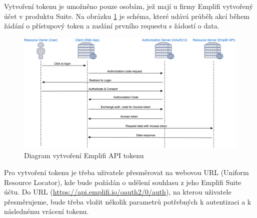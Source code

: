 \documentclass[czech, bc, kiv, he, iso690numb]{fasthesis}
\begin{document}
Vytvoření tokenu je umožněno pouze osobám, jež mají u firmy Emplifi vytvořený účet v produktu Suite. Na obrázku \ref{fig:emplifAPIDiagram} je schéma, které udává průběh akcí během žádání o 
přístupový token a zaslání prvního requestu s žádostí o data.
\begin{figure}
	\centering
	\includegraphics[width=1\textwidth]{pictures/emplifiAPI.png}
	\caption{Diagram vytvoření Emplifi API tokenu \cite{emplifiDocs}}
	\label{fig:emplifAPIDiagram}
\end{figure}

Pro vytvoření tokenu je třeba uživatele přesměrovat na webovou URL (Uniform Resource Locator), kde bude požádán o udělení souhlasu z jeho Emplifi Suite účtu.
Do URL (\url{https://api.emplifi.io/oauth2/0/auth}), na kterou uživatele přesměrujeme, bude třeba vložit několik parametrů potřebných k autentizaci a k následnému vrácení tokenu. 
\end{document}
